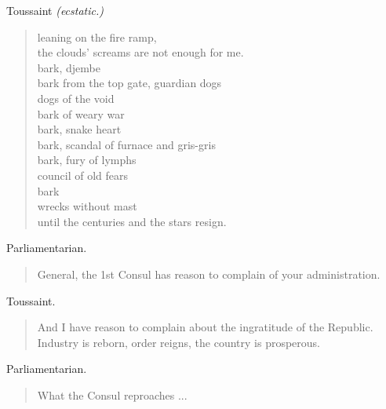 \documentclass[letterpaper,article,12pt,oneside,notitlepage]{memoir}
\begin{document}
\clearpage

\begin{center}Toussaint \textit{(ecstatic.)}\end{center}

\begin{verse}
leaning on the fire ramp, \\
the clouds' screams are not enough for me. \\
bark, djembe \\
bark from the top gate, guardian dogs \\
dogs of the void \\
bark of weary war \\
bark, snake heart \\
bark, scandal of furnace and gris-gris \\
bark, fury of lymphs \\
council of old fears \\
bark \\
wrecks without mast \\
until the centuries and the stars resign. \\
\end{verse}

\begin{center}Parliamentarian.\end{center}

\begin{verse}
\hspace{1cm} General, the 1st Consul has reason to complain of your administration. \\
\end{verse}

\begin{center}Toussaint.\end{center}

\begin{verse}
\hspace{1cm} And I have reason to complain about the ingratitude of the Republic. \\
Industry is reborn, order reigns, the country is prosperous. \\
\end{verse}

\begin{center}Parliamentarian.\end{center}

\begin{verse}
What the Consul reproaches ... \\
\end{verse}
\end{document}
